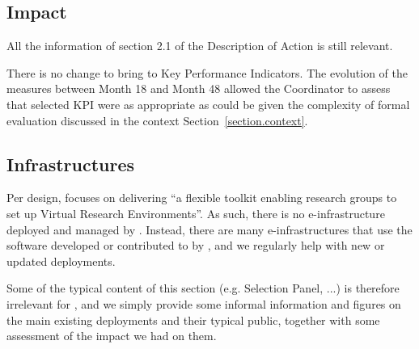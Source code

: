   \subsection{Impact}

  All the information of section 2.1 of the Description of Action is still relevant.

  There is no change to bring to Key Performance Indicators.
  The evolution of the measures between Month 18 and Month 48 allowed
  the Coordinator to assess that selected KPI were as appropriate as
  could be given the complexity of formal evaluation discussed in the
  context Section~\ref{section.context}.

\subsection{Infrastructures}

\label{infrastructures}

Per design, \ODK focuses on delivering ``a flexible toolkit enabling
research groups to set up Virtual Research Environments''. As such,
there is no e-infrastructure deployed and managed by \ODK. Instead,
there are many e-infrastructures that use the software developed or
contributed to by \ODK, and we regularly help with new or updated
deployments.

Some of the typical content of this section (e.g. Selection Panel,
...) is therefore irrelevant for \ODK, and we simply provide some
informal information and figures on the main existing deployments and
their typical public, together with some assessment of the impact we
had on them.

